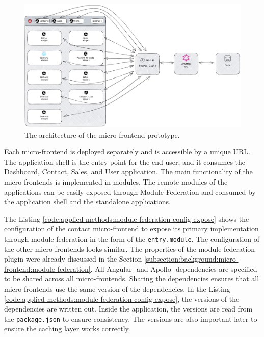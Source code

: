 \ifshowImages
\begin{figure}[H]
    \centering
    \includegraphics[width=1\linewidth]{images/applied-methods/prototypical-implementation/host-architecture.jpg}
    \caption{The architecture of the micro-frontend prototype.}\label{fig:applied-methods:prototype-micro-frontend-architecture}
\end{figure}
\fi

\noindent Each micro-frontend is deployed separately and is accessible by a unique \ac{URL}. The application shell is the entry point for the end user, and it consumes the Dashboard, Contact, Sales, and User application. The main functionality of the micro-frontends is implemented in modules. The remote modules of the applications can be easily exposed through Module Federation and consumed by the application shell and the standalone applications.

\bigskip

\noindent The Listing \ref{code:applied-methods:module-federation-config-expose} shows the configuration of the contact micro-frontend to expose its primary implementation through module federation in the form of the \texttt{entry.module}. The configuration of the other micro-frontends looks similar. The properties of the module-federation plugin were already discussed in the Section \ref{subsection:background:micro-frontend:module-federation}. All Angular- and Apollo- dependencies are specified to be shared across all micro-frontends. Sharing the dependencies ensures that all micro-frontends use the same version of the dependencies. In the Listing \ref{code:applied-methods:module-federation-config-expose}, the versions of the dependencies are written out. Inside the application, the versions are read from the \texttt{package.json} to ensure consistency. The versions are also important later to ensure the caching layer works correctly.

